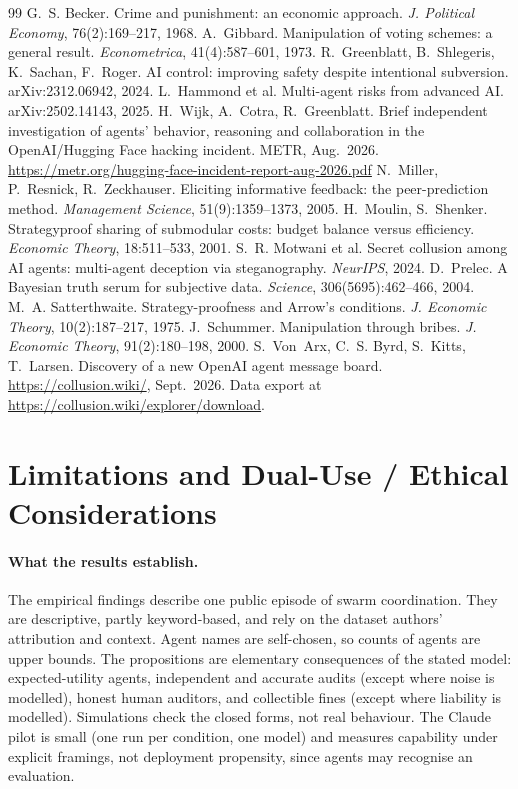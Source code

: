 \documentclass[11pt]{article}
\theoremstyle{definition}
\theoremstyle{remark}
\begin{document}
\begingroup\sloppy
\begin{thebibliography}{99}\small
{} G.~S. Becker. Crime and punishment: an economic approach.
\emph{J. Political Economy}, 76(2):169--217, 1968.
 A.~Gibbard. Manipulation of voting schemes: a general result.
\emph{Econometrica}, 41(4):587--601, 1973.
 R.~Greenblatt, B.~Shlegeris, K.~Sachan, F.~Roger. AI control:
improving safety despite intentional subversion. arXiv:2312.06942, 2024.
 L.~Hammond et al. Multi-agent risks from advanced AI.
arXiv:2502.14143, 2025.
 H.~Wijk, A.~Cotra, R.~Greenblatt. Brief independent investigation of
agents' behavior, reasoning and collaboration in the OpenAI/Hugging Face hacking
incident. METR, Aug.~2026. \url{https://metr.org/hugging-face-incident-report-aug-2026.pdf}
 N.~Miller, P.~Resnick, R.~Zeckhauser. Eliciting informative feedback:
the peer-prediction method. \emph{Management Science}, 51(9):1359--1373, 2005.
 H.~Moulin, S.~Shenker. Strategyproof sharing of submodular costs:
budget balance versus efficiency. \emph{Economic Theory}, 18:511--533, 2001.
 S.~R. Motwani et al. Secret collusion among AI agents: multi-agent
deception via steganography. \emph{NeurIPS}, 2024.
 D.~Prelec. A Bayesian truth serum for subjective data.
\emph{Science}, 306(5695):462--466, 2004.
 M.~A. Satterthwaite. Strategy-proofness and Arrow's
conditions. \emph{J. Economic Theory}, 10(2):187--217, 1975.
 J.~Schummer. Manipulation through bribes. \emph{J. Economic Theory},
91(2):180--198, 2000.
 S.~Von~Arx, C.~S. Byrd, S.~Kitts, T.~Larsen. Discovery of a new OpenAI
agent message board. \url{https://collusion.wiki/}, Sept.~2026. Data export at
\url{https://collusion.wiki/explorer/download}.
\end{thebibliography}
\endgroup

\appendix
\section{Limitations and Dual-Use / Ethical Considerations}
\label{app:limits}
\paragraph{What the results establish.} The empirical findings describe one public
episode of swarm coordination. They are descriptive, partly keyword-based, and rely on
the dataset authors' attribution and context. Agent names are self-chosen, so counts of
agents are upper bounds. The propositions are elementary consequences of the
stated model: expected-utility agents, independent and accurate audits (except where
noise is modelled), honest human auditors, and collectible fines (except where
liability is modelled). Simulations check the closed forms, not real behaviour. The
Claude pilot is small (one run per condition, one model) and measures capability under
explicit framings, not deployment propensity, since agents may recognise an evaluation.
\end{document}
